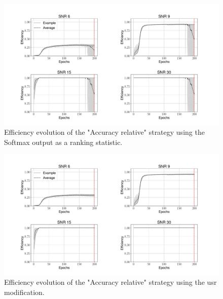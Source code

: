 \begin{figure}
    \centering
    \includegraphics[width=\textwidth]{chapters/training_strats/images/acc_rel_soft.pdf}
    \caption[Efficiency evolution ``Accuracy relative'' using Softmax]{Efficiency evolution of the "Accuracy relative" strategy using the Softmax output as a ranking statistic.}
    \label{fig:efficiency_evolution_acc_rel_soft}
\end{figure}

\begin{figure}
    \centering
    \includegraphics[width=\textwidth]{chapters/training_strats/images/acc_rel_lin.pdf}
    \caption[Efficiency evolution ``Accuracy relative'' using unbounded Softmax replacement]{Efficiency evolution of the "Accuracy relative" strategy using the \acrshort{usr} modification.}
    \label{fig:efficiency_evolution_acc_rel_lin}
\end{figure}

